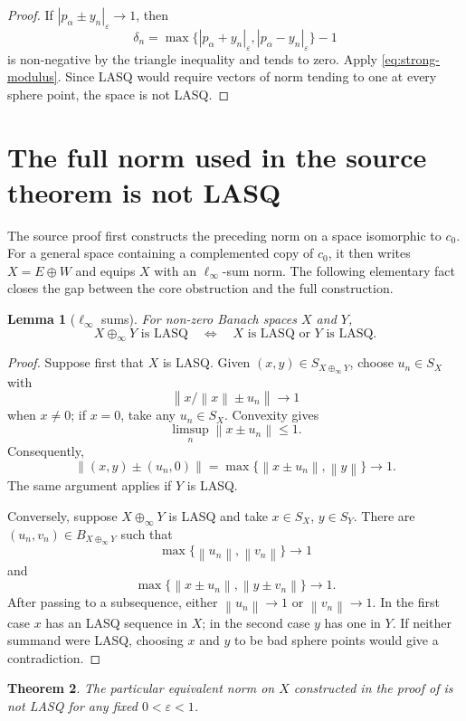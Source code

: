 \documentclass[11pt]{article}
\newtheorem{theorem}{Theorem}[section]
\newtheorem{lemma}[theorem]{Lemma}
\newcommand{\eps}{\varepsilon}
\newcommand{\norm}[1]{\left\lVert #1\right\rVert}
\newcommand{\sourceNorm}[1]{\left\lvert #1\right\rvert_{\eps}}
\begin{document}
\begin{proof}
If $\sourceNorm{p_\alpha\pm y_n}\to1$, then
\[
 \delta_n=\max\{\sourceNorm{p_\alpha+y_n},\sourceNorm{p_\alpha-y_n}\}-1
\]
is non-negative by the triangle inequality and tends to zero.  Apply \eqref{eq:strong-modulus}.  Since LASQ would require vectors of norm tending to one at every sphere point, the space is not LASQ.
\end{proof}

\section{The full norm used in the source theorem is not LASQ}
\label{sec:full-source}

The source proof first constructs the preceding norm on a space isomorphic to $c_0$.  For a general space containing a complemented copy of $c_0$, it then writes $X=E\oplus W$ and equips $X$ with an $\ell_\infty$-sum norm.  The following elementary fact closes the gap between the core obstruction and the full construction.

\begin{lemma}[$\ell_\infty$ sums]
\label{lem:linfty-lasq}
For non-zero Banach spaces $X$ and $Y$,
\[
 X\oplus_\infty Y\text{ is LASQ}
 \quad\Longleftrightarrow\quad
 X\text{ is LASQ or }Y\text{ is LASQ}.
\]
\end{lemma}

\begin{proof}
Suppose first that $X$ is LASQ.  Given $(x,y)\in S_{X\oplus_\infty Y}$, choose $u_n\in S_X$ with
\[
 \norm{x/\norm{x}\pm u_n}\to1
\]
when $x\ne0$; if $x=0$, take any $u_n\in S_X$.  Convexity gives
\[
 \limsup_n\norm{x\pm u_n}\le1.
\]
Consequently,
\[
 \norm{(x,y)\pm(u_n,0)}
 =\max\{\norm{x\pm u_n},\norm{y}\}\longrightarrow1.
\]
The same argument applies if $Y$ is LASQ.

Conversely, suppose $X\oplus_\infty Y$ is LASQ and take $x\in S_X$, $y\in S_Y$.  There are $(u_n,v_n)\in B_{X\oplus_\infty Y}$ such that
\[
 \max\{\norm{u_n},\norm{v_n}\}\to1
\]
and
\[
 \max\{\norm{x\pm u_n},\norm{y\pm v_n}\}\to1.
\]
After passing to a subsequence, either $\norm{u_n}\to1$ or $\norm{v_n}\to1$.  In the first case $x$ has an LASQ sequence in $X$; in the second case $y$ has one in $Y$.  If neither summand were LASQ, choosing $x$ and $y$ to be bad sphere points would give a contradiction.
\end{proof}

\begin{theorem}
\label{thm:full-source-not-lasq}
The particular equivalent norm on $X$ constructed in the proof of \cite[Theorem~1.2]{RodriguezRueda2023} is not LASQ for any fixed $0<\eps<1$.
\end{theorem}
\end{document}
